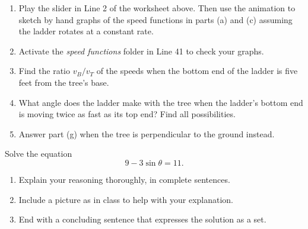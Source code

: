 \documentclass{ximera}
\begin{document}
\begin{question}
\begin{enumerate}
\item Play the slider in Line 2 of the worksheet above. Then use the animation to sketch by hand graphs of the speed functions in parts (a) and (c) assuming the ladder rotates at a constant rate.

\item Activate the \emph{speed functions} folder in Line 41 to check your graphs.

\item Find the ratio $v_B/v_T$ of the speeds when the bottom end of the ladder is five feet from the tree's base.

\item What angle does the ladder make with the tree when the ladder's bottom end is moving twice as fast as its top end? Find all possibilities.

\item Answer part (g) when the tree is perpendicular to the ground instead.

\end{enumerate}

\end{question}

\begin{question}  \label{Q34hghnbnnh}
Solve the equation
\[
        9 - 3 \sin \theta = 11 .
\]

\begin{enumerate}
\item Explain your reasoning thoroughly, in complete sentences.

\item Include a picture as in class to help with your explanation.

\item End with a concluding sentence that expresses the solution as a set.
\end{enumerate}

\end{question}
\end{document}
